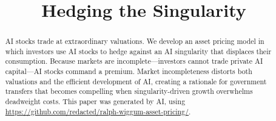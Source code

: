 \documentclass[12pt]{article}
\title{Hedging the Singularity}
\author{}
\date{}
\begin{document}
\maketitle
\thispagestyle{plain}

\begin{abstract}
\noindent AI stocks trade at extraordinary valuations. We develop an asset pricing model in which investors use AI stocks to hedge against an AI singularity that displaces their consumption. Because markets are incomplete---investors cannot trade private AI capital---AI stocks command a premium. Market incompleteness distorts both valuations and the efficient development of AI, creating a rationale for government transfers that becomes compelling when singularity-driven growth overwhelms deadweight costs. This paper was generated by AI, using \url{https://github.com/redacted/ralph-wiggum-asset-pricing/}. 
\end{abstract}
\end{document}
